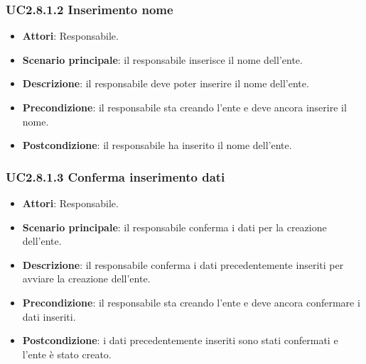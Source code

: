 \subsubsection{UC2.8.1.2 Inserimento nome}
\begin{itemize}
\item \textbf{Attori}: Responsabile.
\item \textbf{Scenario principale}: il responsabile inserisce il nome dell'ente.
\item \textbf{Descrizione}:  il responsabile deve poter inserire il nome dell'ente.
\item \textbf{Precondizione}: il responsabile sta creando l'ente e deve ancora inserire il nome.
\item \textbf{Postcondizione}: il responsabile ha inserito il nome dell'ente.
\end{itemize}
\subsubsection{UC2.8.1.3 Conferma inserimento dati}
\begin{itemize}
\item \textbf{Attori}: Responsabile.
\item \textbf{Scenario principale}: il responsabile conferma i dati per la creazione dell'ente.
\item \textbf{Descrizione}: il responsabile conferma i dati precedentemente inseriti per avviare la creazione dell'ente.
\item \textbf{Precondizione}: il responsabile sta creando l'ente e deve ancora confermare i dati inseriti.
\item \textbf{Postcondizione}: i dati precedentemente inseriti sono stati confermati e l'ente è stato creato.
\end{itemize}

